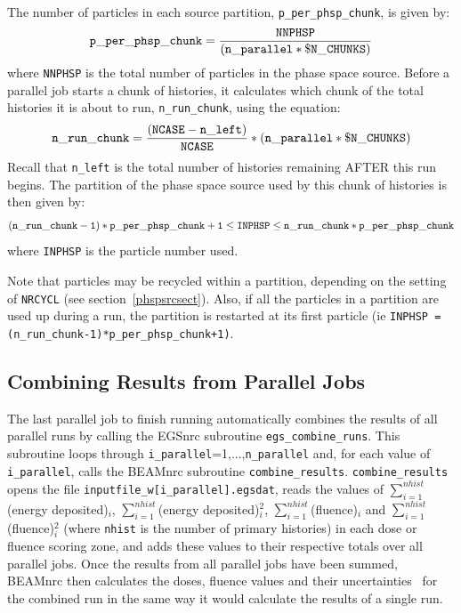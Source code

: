\documentclass[12pt,twoside]{article}
\begin{document}
The number of particles
in each source partition, {\tt p\_per\_phsp\_chunk}, is
given by:
\begin{equation}
{\tt p\_per\_phsp\_chunk} = \frac{{\tt NNPHSP}}{\left({\tt
                 n\_parallel*\$N\_CHUNKS}\right)}
\end{equation}
where {\tt NNPHSP} is the total number of particles in the phase space
source.  Before a parallel job starts a chunk of histories, it calculates
which chunk of the total histories it is about to run,
{\tt n\_run\_chunk}, using the equation:
\begin{equation}
{\tt n\_run\_chunk} = \frac{\left({\tt
NCASE-n\_left}\right)}{{\tt NCASE}}*\left({\tt
n\_parallel*\$N\_CHUNKS}\right)
\end{equation}
Recall that {\tt n\_left} is the total number of histories remaining AFTER
this run begins.  The partition of the phase space source used by this
chunk of histories is then given by:
\begin{equation}
\left({\tt n\_run\_chunk-1}\right)*{\tt p\_per\_phsp\_chunk+1}
\leq {\tt INPHSP} \leq {\tt n\_run\_chunk*p\_per\_phsp\_chunk}
\end{equation}
where {\tt INPHSP} is the particle number used.

Note that particles may be recycled within a partition, depending on
the setting of {\tt NRCYCL} (see section~\ref{phspsrcsect}).  Also, if
all the particles in a partition are used up during a run, the partition
is restarted at its first particle
(ie {\tt INPHSP = (n\_run\_chunk-1)*p\_per\_phsp\_chunk+1)}.

\subsection{Combining Results from Parallel Jobs}
\label{recombinesect}

The last parallel job to finish running automatically combines
the results of all parallel runs by calling the EGSnrc subroutine
{\tt egs\_combine\_runs}.  This subroutine loops through
{\tt i\_parallel}=1,...,{\tt n\_parallel} and, for each value
of {\tt i\_parallel}, calls the BEAMnrc subroutine {\tt combine\_results}.
{\tt combine\_results}
opens the file {\tt inputfile\_w[i\_parallel].egsdat},
reads the values of
$\sum_{i=1}^{nhist}$(energy deposited)$_i$,
$\sum_{i=1}^{nhist}$(energy deposited)$^2_i$,
$\sum_{i=1}^{nhist}$(fluence)$_i$ and
$\sum_{i=1}^{nhist}$(fluence)$^2_i$ (where
{\tt nhist} is the number of primary histories) in each dose or
fluence scoring zone, and adds these values to their respective totals
over all parallel jobs.
Once the results from all parallel jobs have been summed, BEAMnrc
then calculates the doses, fluence values and their uncertainties~\cite{Wa02a}
for the combined run in the same way it would calculate the results
of a single run.
\end{document}

